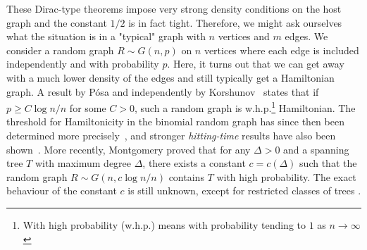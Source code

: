 \documentclass[10pt, a4paper]{article}
\theoremstyle{remark}
\begin{document}
These Dirac-type theorems impose very strong density conditions on the host graph and the constant $1/2$ is in fact tight.
Therefore, we might ask ourselves what the situation is in a "typical" graph with $n$ vertices and $m$ edges.
We consider a random graph $R \sim G(n, p)$ on $n$ vertices where each edge is included independently and with probability $p$.
Here, it turns out that we can get away with a much lower density of the edges and still typically get a Hamiltonian graph.
A result by P\'osa \cite{posa_hamiltonian_1976} and independently by Korshunov~\cite{korshunov1976solution} states that if $p \geq C\log n / n$ for some $C>0$, such a random graph is w.h.p.\footnote{With high probability (w.h.p.) means with probability tending to $1$ as $n \rightarrow \infty$} Hamiltonian. The threshold for Hamiltonicity  in the binomial random graph has since then been determined more precisely~\cite{komlos1983limit}, and stronger \emph{hitting-time} results have also been shown~\cite{ajtai1985first,bollobas1984evolution}.
More recently, Montgomery \cite{montgomery2014embedding,montgomery_spanning_2019} proved that for any $\Delta > 0$ and a spanning tree $T$ with maximum degree $\Delta$, there exists a constant $c = c(\Delta)$ such that the random graph $R \sim G(n, c\log n / n)$ contains $T$ with high probability.
The exact behaviour of the constant $c$  is still unknown, except for restricted classes of trees \cite{hefetz_spanning_threshold, montgomery2014sharp}.
\end{document}

